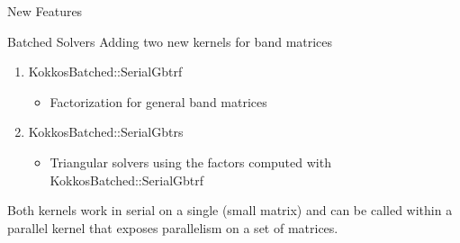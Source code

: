 \begin{frame}[fragile]

  {\Huge New Features}

  \vspace{10pt}

\end{frame}

\begin{frame}[fragile]{Batched Solvers}
  Adding two new kernels for band matrices 
  \begin{enumerate}
  \item {\ttfamily KokkosBatched::SerialGbtrf}
    \begin{itemize}
    \item Factorization for general band matrices
    \end{itemize}
  \item {\ttfamily KokkosBatched::SerialGbtrs}
    \begin{itemize}
    \item Triangular solvers using the factors computed with {\ttfamily KokkosBatched::SerialGbtrf}
    \end{itemize}
  \end{enumerate}
  Both kernels work in serial on a single (small matrix) and can be called within a parallel kernel that exposes parallelism on a set of matrices.
\end{frame}
